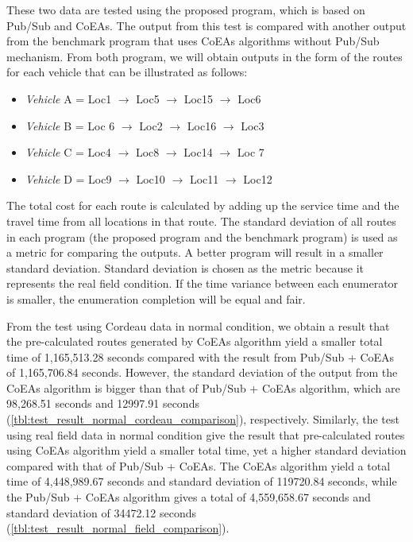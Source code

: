 \documentclass[conference]{IEEEtran}
\begin{document}
These two data are tested using the proposed program, which is based on Pub/Sub and CoEAs. The output from this test is compared with another output from the benchmark program that uses CoEAs algorithms without Pub/Sub mechanism. From both program, we will obtain outputs in the form of the routes for each vehicle that can be illustrated as follows:

\begin{itemize}
\item \textit{Vehicle} A = Loc1 $\rightarrow$ Loc5 $\rightarrow$ Loc15 $\rightarrow$ Loc6
\item \textit{Vehicle} B = Loc 6 $\rightarrow$ Loc2 $\rightarrow$ Loc16 $\rightarrow$ Loc3
\item \textit{Vehicle} C = Loc4 $\rightarrow$ Loc8 $\rightarrow$ Loc14 $\rightarrow$ Loc 7
\item \textit{Vehicle} D = Loc9 $\rightarrow$ Loc10 $\rightarrow$ Loc11 $\rightarrow$ Loc12
\end{itemize}


The total cost for each route is calculated by adding up the service time and the travel time from all locations in that route. The standard deviation of all routes in each program (the proposed program and the benchmark program) is used as a metric for comparing the outputs. A better program will result in a smaller standard deviation. Standard deviation is chosen as the metric because it represents the real field condition. If the time variance between each enumerator is smaller, the enumeration completion will be equal and fair. 


From the test using Cordeau data in normal condition, we obtain a result that the pre-calculated routes generated by CoEAs algorithm yield a smaller total time of 1,165,513.28 seconds compared with the result from Pub/Sub + CoEAs of 1,165,706.84 seconds. However, the standard deviation of the output from the CoEAs algorithm is bigger than that of Pub/Sub + CoEAs algorithm, which are 98,268.51 seconds and 12997.91 seconds (\autoref{tbl:test_result_normal_cordeau_comparison}), respectively. Similarly, the test using real field data in normal condition give the result that pre-calculated routes using CoEAs algorithm yield a smaller total time, yet a higher standard deviation compared with that of Pub/Sub + CoEAs. The CoEAs algorithm yield a total time of 4,448,989.67 seconds and standard deviation of 119720.84 seconds, while the Pub/Sub + CoEAs algorithm gives a total of 4,559,658.67 seconds and standard deviation of 34472.12 seconds (\autoref{tbl:test_result_normal_field_comparison}).
\end{document}
